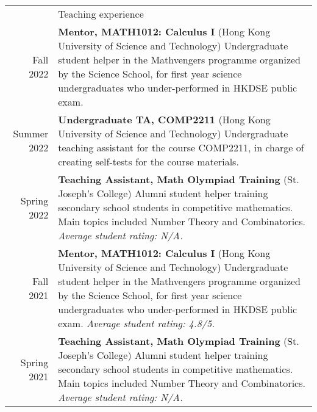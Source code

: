 \documentclass[letterpaper, 11pt]{article}
\newcommand{\headingfont}{\Large\color{OliveGreen}}
\newenvironment{SectionTable}[1]{
	\renewcommand*{\arraystretch}{1.7}
	\setlength{\tabcolsep}{10pt}
	\begin{longtable}{Rp{5.2in}} & #1 \\}
{\end{longtable}\vspace{-.3cm}}
\begin{document}
\begin{SectionTable}{\headingfont Teaching experience}

Fall 2022 & 
\textbf{Mentor, MATH1012: Calculus I} (Hong Kong University of Science and Technology) \newline
Undergraduate student helper in the Mathvengers programme organized by the Science School, for first year science undergraduates who under-performed in HKDSE public exam. \\

Summer 2022 & 
\textbf{Undergraduate TA, COMP2211} (Hong Kong University of Science and Technology) \newline
Undergraduate teaching assistant for the course COMP2211, in charge of creating self-tests for the course materials. \\

Spring 2022 & 
\textbf{Teaching Assistant, Math Olympiad Training} (St. Joseph's College) \newline
Alumni student helper training secondary school students in competitive mathematics. Main topics included Number Theory and Combinatorics.
 \newline
\textit{Average student rating: N/A.} \\


Fall 2021 & 
\textbf{Mentor, MATH1012: Calculus I} (Hong Kong University of Science and Technology) \newline
Undergraduate student helper in the Mathvengers programme organized by the Science School, for first year science undergraduates who under-performed in HKDSE public exam.
 \newline
\textit{Average student rating: 4.8/5.} \\


Spring 2021 & 
\textbf{Teaching Assistant, Math Olympiad Training} (St. Joseph's College) \newline
Alumni student helper training secondary school students in competitive mathematics. Main topics included Number Theory and Combinatorics.
 \newline
\textit{Average student rating: N/A.} \\
\end{SectionTable}
\end{document}
